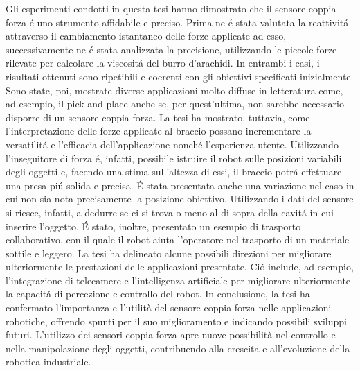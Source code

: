 Gli esperimenti condotti in questa tesi hanno dimostrato che il sensore coppia-forza \'{e} uno strumento affidabile e preciso. 
Prima ne \'{e} stata valutata la reattivit\'{a} attraverso il cambiamento istantaneo delle forze applicate ad esso, 
successivamente ne \'{e} stata analizzata la precisione, utilizzando le piccole forze rilevate per calcolare la viscosit\'{a} del 
burro d'arachidi. 
In entrambi i casi, i risultati ottenuti sono ripetibili e coerenti con gli obiettivi specificati inizialmente. 
Sono state, poi, mostrate diverse applicazioni molto diffuse in letteratura come, ad esempio, il pick and place anche se, per 
quest'ultima, non sarebbe necessario disporre di un sensore coppia-forza. La tesi ha mostrato, tuttavia, come l'interpretazione 
delle forze applicate al braccio possano incrementare la versatilit\'{a} e l'efficacia dell'applicazione nonch\'{e} l'esperienza 
utente. Utilizzando l'inseguitore di forza \'{e}, infatti, possibile istruire il robot sulle posizioni variabili degli oggetti e, 
facendo una stima sull'altezza di essi, il braccio potr\'{a} effettuare una presa pi\'{u} solida e precisa. 
\'{E} stata presentata anche una variazione nel caso in cui non sia nota precisamente la posizione obiettivo. Utilizzando i dati 
del sensore si riesce, infatti, a dedurre se ci si trova o meno al di sopra della cavit\'{a} in cui inserire l'oggetto. 
\'{E} stato, inoltre, presentato un esempio di trasporto collaborativo, con il quale il robot aiuta l'operatore nel trasporto 
di un materiale sottile e leggero. 
La tesi ha delineato alcune possibili direzioni per migliorare ulteriormente le prestazioni delle applicazioni presentate. 
Ci\'{o} include, ad esempio, l'integrazione di telecamere e l'intelligenza artificiale per migliorare ulteriormente la capacit\'{a} 
di percezione e controllo del robot. 
In conclusione, la tesi ha confermato l'importanza e l'utilità del sensore coppia-forza nelle applicazioni robotiche, 
offrendo spunti per il suo miglioramento e indicando possibili sviluppi futuri. L'utilizzo dei sensori coppia-forza apre 
nuove possibilità nel controllo e nella manipolazione degli oggetti, contribuendo alla crescita e all'evoluzione 
della robotica industriale.
